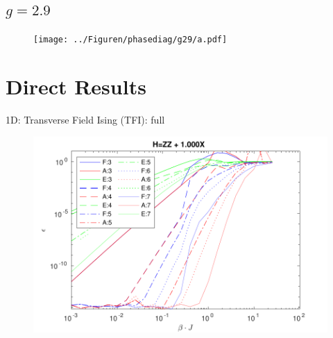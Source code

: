 \subsection{$g=2.9$}

\begin{frame}
    \begin{figure}
        \center
        \texttt{[image: ../Figuren/phasediag/g29/a.pdf]}
    \end{figure}
\end{frame}

\section{Direct Results}

\begin{frame}{1D: Transverse Field Ising (TFI): full }

    \begin{figure}
        \center
        \includegraphics[height=\textheight]{../Figuren/benchmarking/t_ising.pdf}
    \end{figure}

\end{frame}

